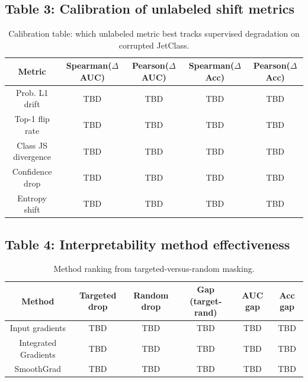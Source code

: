 \documentclass[10pt]{article}
\begin{document}
\subsection*{Table 3: Calibration of unlabeled shift metrics}
\begin{table}[h]
\centering
\small
\begin{tabular}{|c|c|c|c|c|}
\hline
Metric & Spearman($\Delta$AUC) & Pearson($\Delta$AUC) & Spearman($\Delta$Acc) & Pearson($\Delta$Acc) \\
\hline
Prob. L1 drift & TBD & TBD & TBD & TBD \\
\hline
Top-1 flip rate & TBD & TBD & TBD & TBD \\
\hline
Class JS divergence & TBD & TBD & TBD & TBD \\
\hline
Confidence drop & TBD & TBD & TBD & TBD \\
\hline
Entropy shift & TBD & TBD & TBD & TBD \\
\hline
\end{tabular}
\caption{Calibration table: which unlabeled metric best tracks supervised degradation on corrupted JetClass.}
\end{table}

\subsection*{Table 4: Interpretability method effectiveness}
\begin{table}[h]
\centering
\small
\begin{tabular}{|c|c|c|c|c|c|}
\hline
Method & Targeted drop & Random drop & Gap (target-rand) & AUC gap & Acc gap \\
\hline
Input gradients & TBD & TBD & TBD & TBD & TBD \\
\hline
Integrated Gradients & TBD & TBD & TBD & TBD & TBD \\
\hline
SmoothGrad & TBD & TBD & TBD & TBD & TBD \\
\hline
\end{tabular}
\caption{Method ranking from targeted-versus-random masking.}
\end{table}
\end{document}
